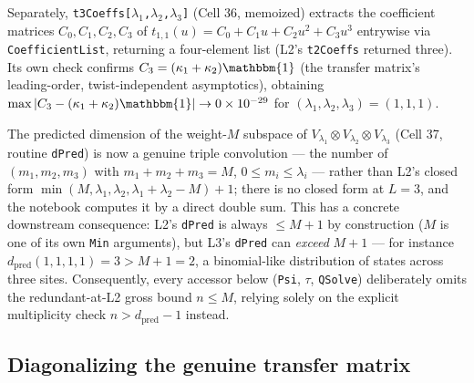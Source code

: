 \documentclass[11pt]{article}
\begin{document}
Separately, \texttt{t3Coeffs[$\lambda_1$,$\lambda_2$,$\lambda_3$]} (Cell 36, memoized) extracts the
coefficient matrices $C_0,C_1,C_2,C_3$ of $t_{1,1}(u)=C_0+C_1u+C_2u^2+C_3u^3$ entrywise via
\texttt{CoefficientList}, returning a four-element list (L2's \texttt{t2Coeffs} returned three). Its
own check confirms $C_3=(\kappa_1+\kappa_2)\mathbbm{1}$ (the transfer matrix's leading-order,
twist-independent asymptotics), obtaining $\max|C_3-(\kappa_1+\kappa_2)\mathbbm{1}|\to0\times10^{-29}$
for $(\lambda_1,\lambda_2,\lambda_3)=(1,1,1)$.

The predicted dimension of the weight-$M$ subspace of $V_{\lambda_1}\otimes V_{\lambda_2}\otimes
V_{\lambda_3}$ (Cell 37, routine \texttt{dPred}) is now a genuine triple convolution --- the number of
$(m_1,m_2,m_3)$ with $m_1+m_2+m_3=M$, $0\le m_i\le\lambda_i$ --- rather than L2's closed form
$\min(M,\lambda_1,\lambda_2,\lambda_1+\lambda_2-M)+1$; there is no closed form at $L=3$, and the
notebook computes it by a direct double sum. This has a concrete downstream consequence: L2's
\texttt{dPred} is always $\le M+1$ by construction ($M$ is one of its own \texttt{Min} arguments), but
L3's \texttt{dPred} can \emph{exceed} $M+1$ --- for instance $d_{\mathrm{pred}}(1,1,1,1)=3>M+1=2$, a
binomial-like distribution of states across three sites. Consequently, every accessor below
(\texttt{Psi}, $\tau$, \texttt{QSolve}) deliberately omits the redundant-at-L2 gross bound $n\le M$,
relying solely on the explicit multiplicity check $n>d_{\mathrm{pred}}-1$ instead.

\subsection*{Diagonalizing the genuine transfer matrix}
\label{sec:taueigensystem}
\end{document}
